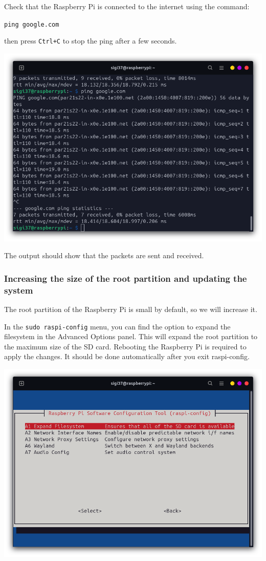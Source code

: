 \documentclass{article}
\begin{document}
Check that the Raspberry Pi is connected to the internet using the command:

\texttt{ping google.com}

then press \texttt{Ctrl+C} to stop the ping after a few seconds.

\includegraphics[scale=0.37]{img/ping_google.png}

The output should show that the packets are sent and received.

\subsubsection{Increasing the size of the root partition and updating the system}

The root partition of the Raspberry Pi is small by default, so we will increase it.

In the \texttt{sudo raspi-config} menu, you can find the option to expand the filesystem in the
Advanced Options panel. This will expand the root partition to the maximum size of the SD card.
Rebooting the Raspberry Pi is required to apply the changes. It should be done automatically after
you exit raspi-config.

\includegraphics[scale=0.37]{img/raspi_config_expand.png}
\end{document}
